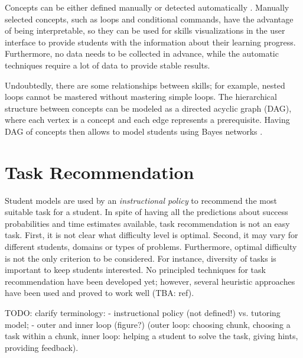 Concepts can be either defined manually or detected automatically
  \cite{niznan-thesis}.  %
Manually selected concepts, such as loops and conditional commands,
  have the advantage of being interpretable,
  so they can be used for skills visualizations in the user interface
  to provide students with the information about their learning progress.
Furthermore, no data needs to be collected in advance,
  while the automatic techniques require a lot of data to provide stable results.  %


Undoubtedly, there are some relationships between skills;
  for example, nested loops cannot be mastered without mastering simple loops.
The hierarchical structure between concepts can be modeled
  as a directed acyclic graph (DAG),
  where each vertex is a concept and each edge represents a prerequisite.
Having DAG of concepts then allows to model students using Bayes networks
  \cite{its-programming}.


\section{Task Recommendation}
\label{sec:task-recommendation}

Student models are used by an \emph{instructional policy} to recommend
  the most suitable task for a student.
In spite of having all the predictions about success probabilities
  and time estimates available,
  task recommendation is not an easy task.
First, it is not clear what difficulty level is optimal.  %
Second, it may vary for different students, domains or types of problems.
Furthermore, optimal difficulty is not the only criterion to be considered.
For instance, diversity of tasks is important to keep students interested.
No principled techniques for task recommendation have been developed yet;
however, several heuristic approaches have been used
  and proved to work well (TBA: ref).

TODO: clarify terminology:
- instructional policy (not defined!) vs. tutoring model;
- outer and inner loop (figure?) (outer loop: choosing chunk, choosing a
  task within a chunk, inner loop: helping a student to solve the task,
  giving hints, providing feedback).

